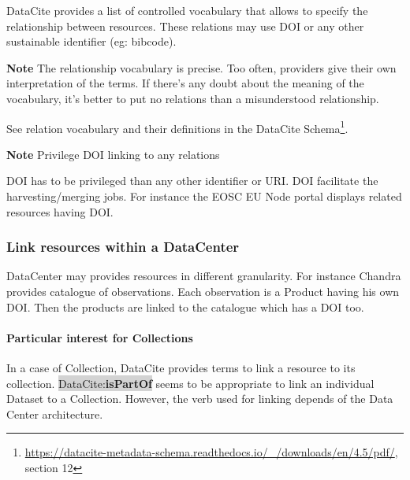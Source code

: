 \documentclass[11pt,a4paper]{ivoa}
\newcommand{\dataciteterm}[1]{\colorbox{lightgray}{DataCite:\textbf{#1}}}
\newcommand{\important}[1]{
	\begin{bigdescription}
		\item \color{ivoacolor}\textbf{Note} #1
	\end{bigdescription}
}
\begin{document}
DataCite provides a list of controlled vocabulary that allows to specify the relationship between resources.
These relations may use DOI or any other sustainable identifier (eg: bibcode).

\important{	
The relationship vocabulary is precise.
Too often, providers give their own interpretation of the terms.
If there's any doubt about the meaning of the vocabulary,
it's better to put no relations than a misunderstood relationship.
}

See relation vocabulary and their definitions in the DataCite Schema\footnote{\url{https://datacite-metadata-schema.readthedocs.io/_/downloads/en/4.5/pdf/}, section 12}.


\important{Privilege DOI linking to any relations}

DOI has to be privileged than any other identifier or URI. DOI facilitate the harvesting/merging jobs. For instance the EOSC EU Node portal displays related resources having DOI.



\subsubsection{Link resources within a DataCenter}
DataCenter may provides resources in different granularity. For instance Chandra provides catalogue of observations. Each observation is a Product having his own DOI.
Then the products are linked to the catalogue which has a DOI too.

\paragraph{Particular interest for Collections}
In a case of Collection, DataCite provides terms to link a resource  to its collection. 
\dataciteterm{isPartOf}  seems to be appropriate to link an individual Dataset to a Collection. However, the verb used for linking depends of the Data Center architecture. \\
\end{document}

